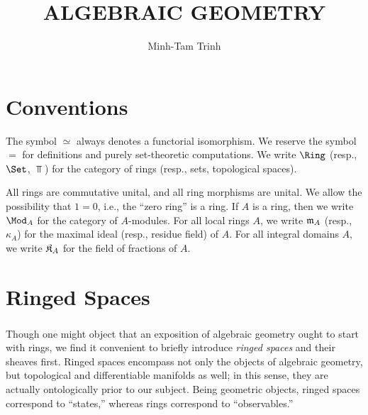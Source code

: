 \documentclass[10pt,final,oneside]{amsbook}
\numberwithin{equation}{section}
\begin{document}
\frontmatter


\title{\MakeUppercase{Algebraic Geometry}}


\author{Minh-Tam Trinh}

\maketitle
\tableofcontents


\mainmatter

\chapter*{Conventions}

The symbol $\simeq$ always denotes a functorial isomorphism.
We reserve the symbol $=$ for definitions and purely set-theoretic computations.
We write $\Ring$ (resp., $\Set$, $\Top$) for the category of rings (resp., sets, topological spaces).

All rings are commutative unital, and all ring morphisms are unital.
We allow the possibility that $1 = 0$, i.e., the ``zero ring'' is a ring.
If $A$ is a ring, then we write $\Mod_A$ for the category of $A$-modules.
For all local rings $A$, we write $\mathfrak{m}_A$ (resp., $\kappa_A$) for the maximal ideal (resp., residue field) of $A$.
For all integral domains $A$, we write $\frak{K}_A$ for the field of fractions of $A$.

\setcounter{chapter}{-1}
\chapter{Ringed Spaces}

\subsection{}

Though one might object that an exposition of algebraic geometry ought to start with rings, we find it convenient to briefly introduce \emph{ringed spaces} and their sheaves first.
Ringed spaces encompass not only the objects of algebraic geometry, but topological and differentiable manifolds as well; in this sense, they are actually ontologically prior to our subject.
Being geometric objects, ringed spaces correspond to ``states,'' whereas rings correspond to ``observables.''
\end{document}
